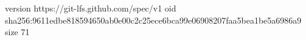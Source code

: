 version https://git-lfs.github.com/spec/v1
oid sha256:9611edbe818594650ab0e00c2c25ece6bca99e06908207faa5bea1be5a6986a9
size 71
